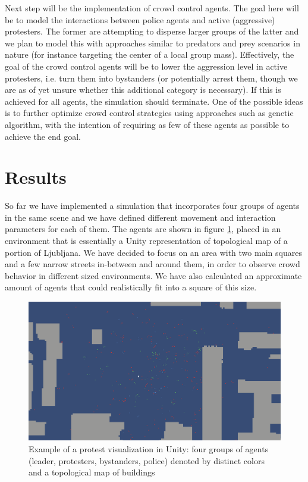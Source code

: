 \documentclass[9pt]{pnas-new}
\begin{document}
\bigskip
Next step will be the implementation of crowd control agents. The goal here will be to model the interactions between police agents and active (aggressive) protesters. The former are attempting to disperse larger groups of the latter and we plan to model this with approaches similar to predators and prey scenarios in nature (for instance targeting the center of a local group mass). Effectively, the goal of the crowd control agents will be to lower the aggression level in active protesters, i.e. turn them into bystanders (or potentially arrest them, though we are as of yet unsure whether this additional category is necessary). If this is achieved for all agents, the simulation should terminate. One of the possible ideas is to further optimize crowd control strategies using approaches such as genetic algorithm, with the intention of requiring as few of these agents as possible to achieve the end goal. 

\section*{Results}

So far we have implemented a simulation that incorporates four groups of agents in the same scene and we have defined different movement and interaction parameters for each of them. The agents are shown in figure \ref{fig1}, placed in an environment that is essentially a Unity representation of topological map of a portion of Ljubljana. We have decided to focus on an area with two main squares and a few narrow streets in-between and around them, in order to observe crowd behavior in different sized environments. We have also calculated an approximate amount of agents that could realistically fit into a square of this size. 

\begin{figure}[H]
\begin{center}
\includegraphics[width=0.95\columnwidth]{simulation.png}
\end{center}
\caption{Example of a protest visualization in Unity: four groups of agents (leader, protesters, bystanders, police) denoted by distinct colors and a topological map of buildings}
\label{fig1}
\end{figure}
\end{document}
